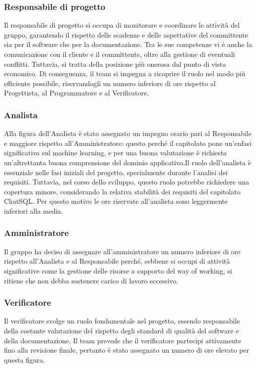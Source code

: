 \subsubsection{Responsabile di progetto}
Il responsabile di progetto si occupa di monitorare e coordinare le attività del gruppo, garantendo il rispetto delle scadenze e delle aspettative del committente sia per il software che per la documentazione. Tra le sue competenze vi è anche la comunicazione con il cliente e il committente, oltre alla gestione di eventuali conflitti. Tuttavia, si tratta della posizione più onerosa dal punto di vista economico. Di conseguenza, il team si impegna a ricoprire il ruolo nel modo più efficiente possibile, riservandogli un numero inferiore di ore rispetto al Progettista, al Programmatore e al Verificatore.

\subsubsection{Analista}
Alla figura dell'Analista è stato assegnato un impegno orario pari al Responsabile e maggiore rispetto all'Amministratore: questo perché il capitolato pone un'enfasi significativa sul machine learning, e per una buona valutazione è richiesta un'altrettanta buona comprensione del dominio applicativo.Il ruolo dell'analista è essenziale nelle fasi iniziali del progetto, specialmente durante l’analisi dei requisiti. Tuttavia, nel corso dello sviluppo, questo ruolo potrebbe richiedere una copertura minore, considerando la relativa stabilità dei requisiti del capitolato ChatSQL. Per questo motivo le ore riservate all'analista sono leggermente inferiori alla media.

\subsubsection{Amministratore}
Il gruppo ha deciso di assegnare all'amministratore un numero inferiore di ore rispetto all’Analista e al Responsabile perché, sebbene si occupi di attività significative come la gestione delle risorse a supporto del way of working, si ritiene che non debba sostenere carico di lavoro eccessivo.

\subsubsection{Verificatore}
Il verificatore svolge un ruolo fondamentale nel progetto, essendo responsabile della costante valutazione del rispetto degli standard di qualità del software e della documentazione. Il team prevede che il verificatore partecipi attivamente fino alla revisione finale, pertanto è stato assegnato un numero di ore elevato per questa figura.

